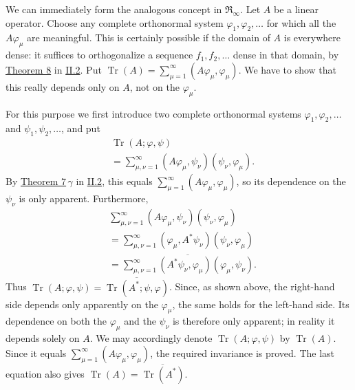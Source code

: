 \documentclass[fontsize=13pt,twoside,openany,headings=normal,parskip=false,bookmarkpackage=false,DIV=calc]{scrbook}
\begin{document}
We can immediately form the analogous concept in $\mathfrak R_\infty$. Let $A$ be a linear operator. Choose any complete orthonormal system $\varphi_1,\varphi_2,\ldots$ for which all the $A\varphi_\mu$ are meaningful. This is certainly possible if the domain of $A$ is everywhere dense: it suffices to orthogonalize a sequence $f_1,f_2,\ldots$ dense in that domain, by \hyperref[thm:II.8]{Theorem 8} in \hyperref[sec:II.2]{II.2}. Put $\operatorname{Tr}(A)=\sum_{\mu=1}^\infty(A\varphi_\mu,\varphi_\mu)$. We have to show that this really depends only on $A$, not on the $\varphi_\mu$.

\hypertarget{origpage-94}{}%
For this purpose we first introduce two complete orthonormal systems $\varphi_1,\varphi_2,\ldots$ and $\psi_1,\psi_2,\ldots$, and put
\begin{align*}
&\operatorname{Tr}(A;\varphi,\psi)\\
&=\sum_{\mu,\nu=1}^\infty(A\varphi_\mu,\psi_\nu)(\psi_\nu,\varphi_\mu).
\end{align*}
By \hyperref[thm:II.7]{Theorem 7}\,$\gamma$ in \hyperref[sec:II.2]{II.2}, this equals $\sum_{\mu=1}^\infty(A\varphi_\mu,\varphi_\mu)$, so its dependence on the $\psi_\nu$ is only apparent. Furthermore,
\begin{align*}
&\sum_{\mu,\nu=1}^\infty(A\varphi_\mu,\psi_\nu)(\psi_\nu,\varphi_\mu)\\
&=\sum_{\mu,\nu=1}^\infty(\varphi_\mu,A^*\psi_\nu)(\psi_\nu,\varphi_\mu)\\
&=\overline{\sum_{\mu,\nu=1}^\infty(A^*\psi_\nu,\varphi_\mu)(\varphi_\mu,\psi_\nu)}.
\end{align*}
Thus $\operatorname{Tr}(A;\varphi,\psi)=\overline{\operatorname{Tr}(A^*;\psi,\varphi)}$. Since, as shown above, the right-hand side depends only apparently on the $\varphi_\mu$, the same holds for the left-hand side. Its dependence on both the $\varphi_\mu$ and the $\psi_\nu$ is therefore only apparent; in reality it depends solely on $A$. We may accordingly denote $\operatorname{Tr}(A;\varphi,\psi)$ by $\operatorname{Tr}(A)$. Since it equals $\sum_{\mu=1}^\infty(A\varphi_\mu,\varphi_\mu)$, the required invariance is proved. The last equation also gives $\operatorname{Tr}(A)=\overline{\operatorname{Tr}(A^*)}$.
\end{document}
